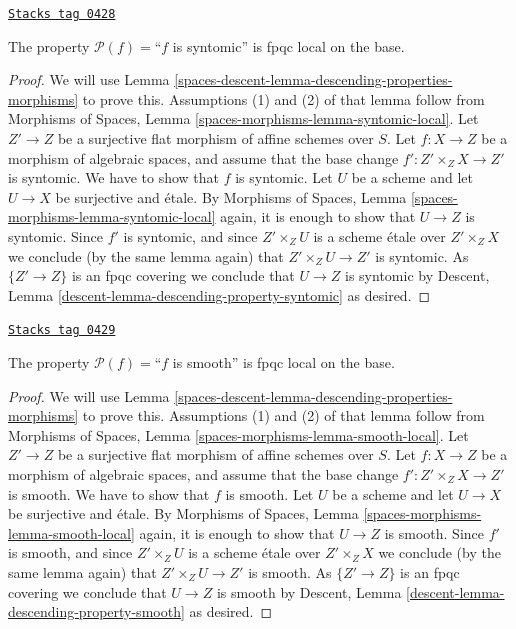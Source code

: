 \begin{lemma}
\label{spaces-descent-lemma-descending-property-syntomic}
\href{https://stacks.math.columbia.edu/tag/0428}{\texttt{Stacks tag 0428}}

The property $\mathcal{P}(f) =$``$f$ is syntomic''
is fpqc local on the base.
\end{lemma}

\begin{proof}
We will use
Lemma \ref{spaces-descent-lemma-descending-properties-morphisms}
to prove this. Assumptions (1) and (2) of that lemma follow from
Morphisms of Spaces,
Lemma \ref{spaces-morphisms-lemma-syntomic-local}.
Let $Z' \to Z$ be a surjective flat morphism of affine schemes over $S$.
Let $f : X \to Z$ be a morphism of algebraic spaces, and assume
that the base change $f' : Z' \times_Z X \to Z'$ is syntomic.
We have to show that $f$ is syntomic. Let $U$ be a scheme
and let $U \to X$ be surjective and \'etale. By
Morphisms of Spaces,
Lemma \ref{spaces-morphisms-lemma-syntomic-local}
again, it is enough to show that $U \to Z$ is syntomic.
Since $f'$ is syntomic, and since $Z' \times_Z U$ is a
scheme \'etale over $Z' \times_Z X$ we conclude (by the same lemma again) that
$Z' \times_Z U \to Z'$ is syntomic.
As $\{Z' \to Z\}$ is an fpqc covering we conclude that
$U \to Z$ is syntomic by
Descent, Lemma \ref{descent-lemma-descending-property-syntomic}
as desired.
\end{proof}

\begin{lemma}
\label{spaces-descent-lemma-descending-property-smooth}
\href{https://stacks.math.columbia.edu/tag/0429}{\texttt{Stacks tag 0429}}

The property $\mathcal{P}(f) =$``$f$ is smooth''
is fpqc local on the base.
\end{lemma}

\begin{proof}
We will use
Lemma \ref{spaces-descent-lemma-descending-properties-morphisms}
to prove this. Assumptions (1) and (2) of that lemma follow from
Morphisms of Spaces,
Lemma \ref{spaces-morphisms-lemma-smooth-local}.
Let $Z' \to Z$ be a surjective flat morphism of affine schemes over $S$.
Let $f : X \to Z$ be a morphism of algebraic spaces, and assume
that the base change $f' : Z' \times_Z X \to Z'$ is smooth.
We have to show that $f$ is smooth. Let $U$ be a scheme
and let $U \to X$ be surjective and \'etale. By
Morphisms of Spaces,
Lemma \ref{spaces-morphisms-lemma-smooth-local}
again, it is enough to show that $U \to Z$ is smooth.
Since $f'$ is smooth, and since $Z' \times_Z U$ is a
scheme \'etale over $Z' \times_Z X$ we conclude (by the same lemma again) that
$Z' \times_Z U \to Z'$ is smooth.
As $\{Z' \to Z\}$ is an fpqc covering we conclude that
$U \to Z$ is smooth by
Descent, Lemma \ref{descent-lemma-descending-property-smooth}
as desired.
\end{proof}

